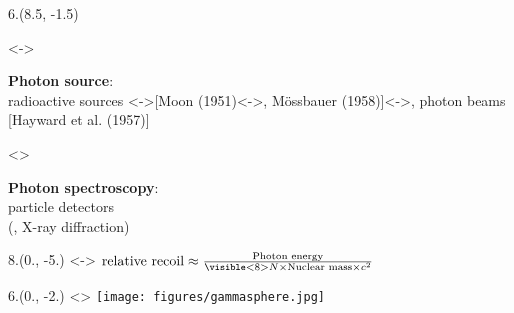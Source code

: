 \begin{textblock}{6.}(8.5, -1.5)
    \begin{itemize}
    \visible<\SLIDEPHOTONSOURCE->{
        \item \textbf{Photon source}: \\ 
        radioactive sources \visible<\SLIDEWHEEL->{[Moon (1951)\visible<\SLIDEMOESSBAUER->{, M\"ossbauer (1958)}]}\visible<\SLIDEBEAM->{, photon beams [Hayward et al. (1957)]}
    }
    \visible<\SLIDEDETECTION>{
        \item \textbf{Photon spectroscopy}: \\
        particle detectors \\(, X-ray diffraction)
    }
    \end{itemize}
\end{textblock}

\begin{textblock}{8.}(0., -5.)
    \visible<\SLIDERECOIL-\SLIDEMOESSBAUER>{
        $\text{relative recoil} \approx \frac{\text{Photon energy}}{\visible<\SLIDEMOESSBAUER>{N \times } \text{Nuclear mass} \times c^2}$
    }
\end{textblock}

\begin{textblock}{6.}(0., -2.)
    \visible<\SLIDEDETECTION>{
        \texttt{[image: figures/gammasphere.jpg]}
    }
\end{textblock}